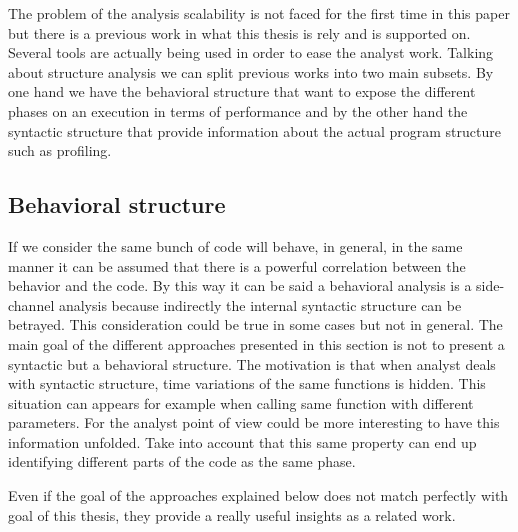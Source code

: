 \documentclass[10pt]{report}
\begin{document}
The problem of the analysis scalability is not faced for the first time in 
this paper but there is a previous work in what this thesis is rely and is 
supported on. Several tools are actually being used in order to ease the analyst
work. Talking about structure analysis we can split previous works into two main
subsets. By one hand we have the behavioral structure that want to expose the
different phases on an execution in terms of performance and by the other hand
the syntactic structure that provide information about the actual program
structure such as profiling.

\subsection{Behavioral structure}

If we consider the same bunch of code will behave, in general, in the same
manner it can be assumed that there is a powerful correlation between the
behavior and the code. By this way it can be said a behavioral analysis is a
side-channel analysis because indirectly the internal syntactic structure can be
betrayed. This consideration could be true in some cases but not in general. The 
main goal of the different approaches presented in this section is not
to present a syntactic but a behavioral structure. The motivation is that when
analyst deals with syntactic structure, time variations of the same functions is
hidden. This situation can appears for example when calling same function with
different parameters. For the analyst point of view could be more interesting to
have this information unfolded. Take into account that this same property can
end up identifying different parts of the code as the same phase.

Even if the goal of the approaches explained below does not match perfectly with
goal of this thesis, they provide a really useful insights as a related work.
\end{document}
